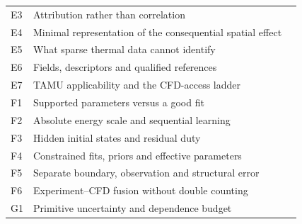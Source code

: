 \begin{longtable}{@{}p{0.45in}p{4.85in}p{0.40in}@{}}
E3 & Attribution rather than correlation & \hyperref[topic:attribution-rather-than-correlation]{\pageref*{topic:attribution-rather-than-correlation}}\\
E4 & Minimal representation of the consequential spatial effect & \hyperref[topic:minimal-representation-of-the-consequential-spatial-effect]{\pageref*{topic:minimal-representation-of-the-consequential-spatial-effect}}\\
E5 & What sparse thermal data cannot identify & \hyperref[topic:what-sparse-thermal-data-cannot-identify]{\pageref*{topic:what-sparse-thermal-data-cannot-identify}}\\
E6 & Fields, descriptors and qualified references & \hyperref[topic:fields-descriptors-and-qualified-references]{\pageref*{topic:fields-descriptors-and-qualified-references}}\\
E7 & TAMU applicability and the CFD-access ladder & \hyperref[topic:tamu-applicability-and-the-cfd-access-ladder]{\pageref*{topic:tamu-applicability-and-the-cfd-access-ladder}}\\
F1 & Supported parameters versus a good fit & \hyperref[topic:supported-parameters-versus-a-good-fit]{\pageref*{topic:supported-parameters-versus-a-good-fit}}\\
F2 & Absolute energy scale and sequential learning & \hyperref[topic:absolute-energy-scale-and-sequential-learning]{\pageref*{topic:absolute-energy-scale-and-sequential-learning}}\\
F3 & Hidden initial states and residual duty & \hyperref[topic:hidden-initial-states-and-residual-duty]{\pageref*{topic:hidden-initial-states-and-residual-duty}}\\
F4 & Constrained fits, priors and effective parameters & \hyperref[topic:constrained-fits-priors-and-effective-parameters]{\pageref*{topic:constrained-fits-priors-and-effective-parameters}}\\
F5 & Separate boundary, observation and structural error & \hyperref[topic:separate-boundary-observation-and-structural-error]{\pageref*{topic:separate-boundary-observation-and-structural-error}}\\
F6 & Experiment--CFD fusion without double counting & \hyperref[topic:experiment-cfd-fusion-without-double-counting]{\pageref*{topic:experiment-cfd-fusion-without-double-counting}}\\
G1 & Primitive uncertainty and dependence budget & \hyperref[topic:primitive-uncertainty-and-dependence-budget]{\pageref*{topic:primitive-uncertainty-and-dependence-budget}}\\

\end{longtable}
